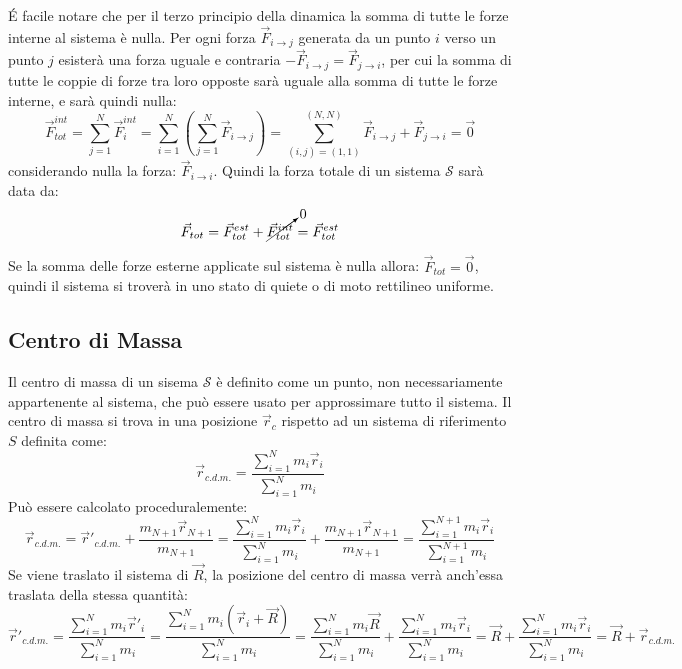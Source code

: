 \documentclass{article}
\numberwithin{equation}{subsection}
\begin{document}
\'{E} facile notare che per il terzo principio della dinamica 
la somma di tutte le forze interne al sistema è nulla. Per ogni 
forza $\vec{F}_{i\to j}$ generata da un punto $i$ verso un punto $j$ 
esisterà una forza uguale e contraria $-\vec{F}_{i\to j}=\vec{F}_{j\to i}$, 
per cui la somma di tutte le coppie di forze tra loro opposte 
sarà uguale alla somma di tutte le forze interne, e sarà quindi nulla:
\begin{equation}
    \vec{F}_{tot}^{int}=\displaystyle\sum_{j=1}^{N}\vec{F}_i^{int}=\sum_{i=1}^{N}\left(\sum_{j=1}^{N}\vec{F}_{i\to j}\right)=\sum_{(i,j)=(1,1)}^{(N,N)}\vec{F}_{i\to j}+\vec{F}_{j\to i}=\vec{0}
\end{equation}
considerando nulla la forza: $\vec{F}_{i\to i}$.
Quindi la forza totale di un sistema $\mathscr{S}$ sarà data da:
\begin{equation}
    \vec{F}_{tot}=\vec{F}^{est}_{tot}+\cancelto{0}{\vec{F}^{int}_{tot}}=\vec{F}^{est}_{tot}
\end{equation}


Se la somma delle forze esterne applicate sul sistema 
è nulla allora: $\vec{F}_{tot}=\vec{0}$, quindi il sistema 
si troverà in uno stato di quiete o di moto rettilineo uniforme. 

\subsection{Centro di Massa}
Il centro di massa di un sisema $\mathscr{S}$ è definito come 
un punto, non necessariamente appartenente al sistema, che può essere usato per approssimare tutto il sistema. 
Il centro di massa si trova in una posizione $\vec{r}_c$ 
rispetto ad un sistema di riferimento $S$ definita come:
\begin{equation}
    \vec{r}_{c.d.m.}=\displaystyle\frac{\sum_{i=1}^{N}m_i\vec{r}_i}{\sum_{i=1}^{N}m_i}
\end{equation}
Può essere calcolato proceduralemente:
\begin{equation*}
    \vec{r}_{c.d.m.}=\displaystyle\vec{r}'_{c.d.m.}+\frac{m_{N+1}\vec{r}_{N+1}}{m_{N+1}}=\frac{\sum_{i=1}^{N}m_i\vec{r}_i}{\sum_{i=1}^{N}m_i}+\frac{m_{N+1}\vec{r}_{N+1}}{m_{N+1}}=\frac{\sum_{i=1}^{N+1}m_i\vec{r}_i}{\sum_{i=1}^{N+1}m_i}
\end{equation*}
Se viene traslato il sistema di $\vec{R}$, la posizione del 
centro di massa verrà anch'essa traslata della stessa quantità:
\begin{equation*}
    \vec{r}'_{c.d.m.}=\displaystyle\frac{\sum_{i=1}^{N}m_i\vec{r}'_i}{\sum_{i=1}^{N}m_i}=\displaystyle\frac{\sum_{i=1}^{N}m_i(\vec{r}_i+\vec{R})}{\sum_{i=1}^{N}m_i}=\displaystyle\frac{\sum_{i=1}^{N}m_i\vec{R}}{\sum_{i=1}^{N}m_i}+\displaystyle\frac{\sum_{i=1}^{N}m_i\vec{r}_i}{\sum_{i=1}^{N}m_i}=\vec{R}+\displaystyle\frac{\sum_{i=1}^{N}m_i\vec{r}_i}{\sum_{i=1}^{N}m_i}=\vec{R}+\vec{r}_{c.d.m.}
\end{equation*}
\end{document}

